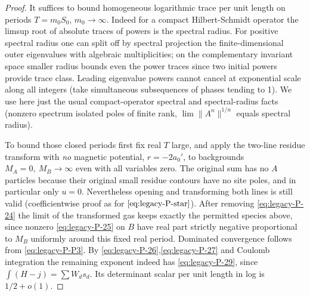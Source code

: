 \begin{proof}
It suffices to bound homogeneous logarithmic trace per unit length on periods \(T=m_0S_0\), \(m_0\to\infty\). Indeed for a compact Hilbert-Schmidt operator the limsup root of absolute traces of powers is the spectral radius. For positive spectral radius one can split off by spectral projection the finite-dimensional outer eigenvalues with algebraic multiplicities; on the complementary invariant space smaller radius bounds even the power traces since two initial powers provide trace class. Leading eigenvalue powers cannot cancel at exponential scale along all integers (take simultaneous subsequences of phases tending to 1). We use here just the usual compact-operator spectral and spectral-radius facts (nonzero spectrum isolated poles of finite rank, \(\lim\|A^n\|^{1/n}\) equals spectral radius).



To bound those closed periods first fix real \(T\) large, and apply the two-line residue transform with \emph{no} magnetic potential, \(r=-2a_0'\), to backgrounds \(M_A=0,\ M_B\to\infty\) even with all variables zero. The original sum has no \(A\) particles because their original small residue contours have no site poles, and in particular only \(u=0\). Nevertheless opening and transforming both lines is still valid (coefficientwise proof as for \(\eqref{eq:legacy-P-star}\)). After removing \eqref{eq:legacy-P-24} the limit of the transformed gas keeps exactly the permitted species above, since nonzero \eqref{eq:legacy-P-25} on \(B\) have real part strictly negative proportional to \(M_B\) uniformly around this fixed real period. Dominated convergence follows from \eqref{eq:legacy-P-P3}. By \eqref{eq:legacy-P-26},\eqref{eq:legacy-P-27} and Coulomb integration the remaining exponent indeed has \eqref{eq:legacy-P-29}, since \(\int (H-j)=\sum W_d s_d\). Its determinant scalar per unit length in log is \(1/2+o(1)\).




\end{proof}
